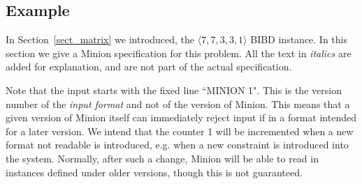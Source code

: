 \documentclass{article}
\begin{document}
\begin{small}
\section{Example}

In Section~\ref{sect_matrix} we introduced, the $\langle 7, 7, 3, 3,
1\rangle$ BIBD instance. In this section we give a Minion specification
for this problem. All the text in \emph{italics} are added for
explanation, and are not part of the actual specification.

Note that the input starts with the fixed line ``MINION 1".   This is the version number of the 
{\em input format} and not of the version of {\sc Minion}.   This means that a given version 
of {\sc Minion} itself can immediately reject input if in a format intended for a later version.
We intend that the counter 1 will be incremented when a new format not readable is introduced, 
e.g. when a new constraint is introduced into the system.    Normally, after such a change,
{\sc Minion} will be able to read in instances defined under older versions, though this
is not guaranteed.



\end{small}
\end{document}
